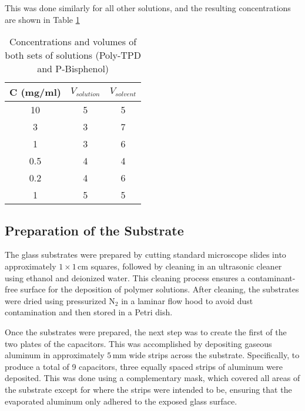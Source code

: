 This was done similarly for all other solutions, and the resulting concentrations are shown in Table \ref{tab:solution-concentrations}

\begin{table}[]
	\caption{Concentrations and volumes of both sets of solutions (Poly-TPD and P-Bisphenol)}
\label{tab:solution-concentrations}
\begin{center}
\begin{tabular}{@{}ccc@{}}
\toprule
C (mg/ml) & $V_{solution}$ & $V_{solvent}$ \\ \midrule
10                    & 5           & 5          \\ \midrule
3                     & 3           & 7          \\ \midrule
1                     & 3           & 6          \\ \midrule
0.5                   & 4           & 4          \\ \midrule
0.2                   & 4           & 6          \\ \midrule
1                     & 5           & 5          \\ \bottomrule
\end{tabular}
\end{center}
\end{table}

\subsection{Preparation of the Substrate}

The glass substrates were prepared by cutting standard microscope slides into approximately $1 \times 1 \, \text{cm}$ squares, followed by cleaning in an ultrasonic cleaner using ethanol and deionized water. This cleaning process ensures a contaminant-free surface for the deposition of polymer solutions. After cleaning, the substrates were dried using pressurized $\text{N}_2$ in a laminar flow hood to avoid dust contamination and then stored in a Petri dish.

Once the substrates were prepared, the next step was to create the first of the two plates of the capacitors. This was accomplished by depositing gaseous aluminum in approximately $5 \, \text{mm}$ wide strips across the substrate. Specifically, to produce a total of 9 capacitors, three equally spaced strips of aluminum were deposited. This was done using a complementary mask, which covered all areas of the substrate except for where the strips were intended to be, ensuring that the evaporated aluminum only adhered to the exposed glass surface.

